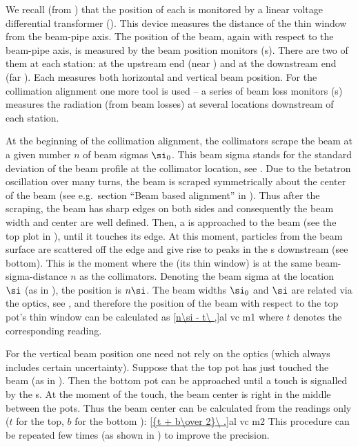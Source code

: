 We recall (from ) that the position of each  is monitored by a linear voltage differential transformer (). This device measures the distance of the thin window from the beam-pipe axis. The position of the beam, again with respect to the beam-pipe axis, is measured by the beam position monitors (s). There are two of them at each station: at the upstream end (near ) and at the downstream end (far ). Each  measures both horizontal and vertical beam position. For the collimation alignment one more tool is used -- a series of beam loss monitors (s) measures the radiation (from beam losses) at several locations downstream of each station.

At the beginning of the collimation alignment, the collimators scrape the beam at a given number $n$ of beam sigmas $\si_0$. This beam sigma stands for the standard deviation of the beam profile at the collimator location, see . Due to the betatron oscillation over many turns, the beam is scraped symmetrically about the center of the beam (see e.g.~section ``Beam based alignment'' in ). Thus after the scraping, the beam has sharp edges on both sides and consequently the beam width and center are well defined. Then, a  is approached to the beam (see the top plot in ), until it touches its edge. At this moment, particles from the beam surface are scattered off the  edge and give rise to peaks in the s downstream (see  bottom). This is the moment where the  (its thin window) is at the same beam-sigma-distance $n$ as the collimators. Denoting the beam sigma at the  location $\si$ (as in ), the  position is $n\si$. The beam widths $\si_0$ and $\si$ are related via the optics, see , and therefore the position of the beam with respect to the top pot's thin window can be calculated as
\eqref{n\si - t\ ,}{al vc m1}
where $t$ denotes the corresponding  reading.

For the vertical beam position one need not rely on the optics (which always includes certain uncertainty). Suppose that the top pot has just touched the beam (as in ). Then the bottom pot can be approached until a touch is signalled by the s. At the moment of the touch, the beam center is right in the middle between the pots. Thus the beam center can be calculated from the  readings only ($t$ for the top, $b$ for the bottom ):
\eqref{{t + b\over 2}\ .}{al vc m2}
This procedure can be repeated few times (as shown in ) to improve the precision.

